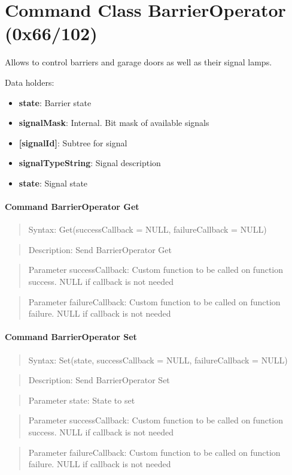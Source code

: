\section{Command Class BarrierOperator (0x66/102)}

Allows to control barriers and garage doors as well as their signal lamps.
\newline

\noindent
Data holders:

\begin{itemize}
\item \textbf{state}: Barrier state
\item \textbf{signalMask}: Internal. Bit mask of available signals
\item \textbf{[signalId]}: Subtree for signal
\item \qquad\textbf{signalTypeString}: Signal description
\item \qquad\textbf{state}: Signal state
\end{itemize}

\paragraph{Command BarrierOperator Get}
\begin{quote}Syntax: Get(successCallback = NULL, failureCallback = NULL)\end{quote}
\begin{quote}Description: Send BarrierOperator Get\end{quote}
\begin{quote}Parameter successCallback: Custom function to be called on function success. NULL if callback is not needed\end{quote}
\begin{quote}Parameter failureCallback: Custom function to be called on function failure. NULL if callback is not needed\end{quote}


\paragraph{Command BarrierOperator Set}
\begin{quote}Syntax: Set(state, successCallback = NULL, failureCallback = NULL)\end{quote}
\begin{quote}Description: Send BarrierOperator Set\end{quote}
\begin{quote}Parameter state: State to set\end{quote}
\begin{quote}Parameter successCallback: Custom function to be called on function success. NULL if callback is not needed\end{quote}
\begin{quote}Parameter failureCallback: Custom function to be called on function failure. NULL if callback is not needed\end{quote}


